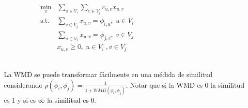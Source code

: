 \documentclass[
	spanish, %
	aspectratio=43, %
	hyperref={pdfencoding=auto,psdextra},
	xcolor={dvipsnames,table,usenames}
]{beamer}
\begin{document}
\begin{frame}
\begin{columns}
\begin{column}{0.4\textwidth}

\begin{align}
\underset{x}{\text{min}}&\sum_{u \in V_{i}}\sum_{v \in V_{j}} c_{u,v}x_{u,v} \\ 
\textrm{s.t.} &\sum_{v \in V_{j}}x_{u,v}= \phi_{i,u}, \; u \in V_{i}\\ 
& \sum_{u \in V_{i}}x_{u,v}= \phi_{j,v}, \; v\in V_{j}\\
& x_{u,v} \geq 0,\; u \in V_{i} \;, v \in V_{j}\\ \nonumber
\end{align}


\end{column}

\begin{column}{0.6\textwidth}
\end{column}

\end{columns}
La WMD se puede transformar fácilmente en una médida de similitud considerando $\rho(\phi_{i}, \phi_{j}) = \frac{1}{1+WMD(\phi_{i}, \phi_{j})}$. Notar que si la WMD es 0 la similitud es 1 y si es $\infty$ la similitud es 0. \\

\end{frame}
\end{document}
